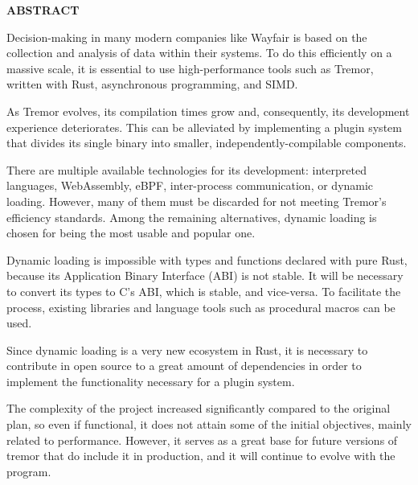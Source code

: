
\begin{center}
{\LARGE \bfseries ABSTRACT}

\vspace{2.5cm}
\end{center}

Decision-making in many modern companies like Wayfair is based on the collection
and analysis of data within their systems. To do this efficiently on a massive
scale, it is essential to use high-performance tools such as Tremor, written
with Rust, asynchronous programming, and SIMD.

As Tremor evolves, its compilation times grow and, consequently, its development
experience deteriorates. This can be alleviated by implementing a plugin system
that divides its single binary into smaller, independently-compilable
components.

There are multiple available technologies for its development: interpreted
languages, WebAssembly, eBPF, inter-process communication, or dynamic loading.
However, many of them must be discarded for not meeting Tremor's efficiency
standards. Among the remaining alternatives, dynamic loading is chosen for being
the most usable and popular one.

Dynamic loading is impossible with types and functions declared with pure Rust,
because its Application Binary Interface (ABI) is not stable. It will be
necessary to convert its types to C's ABI, which is stable, and vice-versa. To
facilitate the process, existing libraries and language tools such as procedural
macros can be used.

Since dynamic loading is a very new ecosystem in Rust, it is necessary to
contribute in open source to a great amount of dependencies in order to
implement the functionality necessary for a plugin system.

The complexity of the project increased significantly compared to the original
plan, so even if functional, it does not attain some of the initial objectives,
mainly related to performance. However, it serves as a great base for future
versions of tremor that do include it in production, and it will continue to
evolve with the program.
